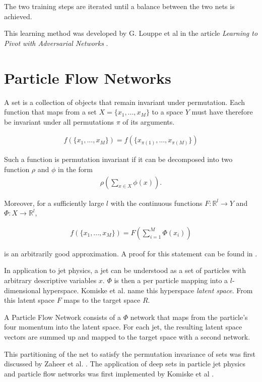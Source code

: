 \documentclass[12pt, a4paper]{thesis}
\begin{document}
The two training steps are iterated until a balance between the two
nets is achieved.

This learning method was developed by G. Louppe et al in the article
\emph{Learning to Pivot with Adversarial Networks}
\cite{louppe16_learn_to_pivot}.

\section{Particle Flow Networks}
\label{sec:orgde973b7}

A set is a collection of objects that remain invariant under
permutation. Each function that maps from a set \(X = \{x_1, ... , x_M
\}\) to a space \(Y\) must have therefore be invariant under all
permutations $\pi$ of its arguments.

\begin{align}
  f(\{x_1, ... , x_M \}) = f(\{x_{\pi(1)}, ... , x_{\pi(M)}\})
\end{align}

Such a function is permutation invariant if it can be decomposed into
two function $\rho$ and $\phi$ in the form
\begin{align}
  \rho \left(\sum_{x\in X} \phi(x)\right).  
\end{align}

Moreover, for a sufficiently large \(l\) with the continuous functions
\(F: \mathbb{R}^l \rightarrow Y\) and \(\Phi: X \rightarrow
\mathbb{R}^l\),

\begin{align}
  f(\{x_1, ... , x_M \}) = F(\sum_{i=1}^M \Phi(x_i))
\end{align}

is an arbitrarily good approximation. A proof for this statement can be
found in \cite{zaheer17_deep_sets}.

In application to jet physics, a jet can be understood as a set of
particles with arbitrary descriptive variables \(x\). \(\Phi\) is then
a per particle mapping into a \(l\)-dimensional hyperspace.  Komiske
et al. name this hyperspace \emph{latent space}. From this latent
space \(F\) maps to the target space \(R\).

A Particle Flow Network \cite{komiske19_energ_flow_networ} consists of
a \(\Phi\) network that maps from the particle's four momentum into
the latent space. For each jet, the resulting latent space vectors are
summed up and mapped to the target space with a second network.

This partitioning of the net to satisfy the permutation invariance of
sets was first discussed by Zaheer et al.
\cite{zaheer17_deep_sets}. The application of deep sets in particle
jet physics and particle flow networks was first implemented by
Komiske et al \cite{komiske19_energ_flow_networ}.
\end{document}
